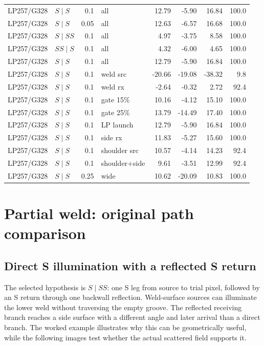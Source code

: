 {\begin{longtable}{@{}llrlrrrr@{}}
LP257/G328 & $S\mid S$ & 0.1 & all & 12.79 & -5.90 & 16.84 & 100.0 \\
LP257/G328 & $S\mid S$ & 0.05 & all & 12.63 & -6.57 & 16.68 & 100.0 \\
LP257/G328 & $S\mid SS$ & 0.1 & all & 4.97 & -3.75 & 8.58 & 100.0 \\
LP257/G328 & $SS\mid S$ & 0.1 & all & 4.32 & -6.00 & 4.65 & 100.0 \\
LP257/G328 & $S\mid S$ & 0.1 & all & 12.79 & -5.90 & 16.84 & 100.0 \\
LP257/G328 & $S\mid S$ & 0.1 & weld src & -20.66 & -19.08 & -38.32 & 9.8 \\
LP257/G328 & $S\mid S$ & 0.1 & weld rx & -2.64 & -0.32 & 2.72 & 92.4 \\
LP257/G328 & $S\mid S$ & 0.1 & gate 15\% & 10.16 & -4.12 & 15.10 & 100.0 \\
LP257/G328 & $S\mid S$ & 0.1 & gate 25\% & 13.79 & -14.49 & 17.40 & 100.0 \\
LP257/G328 & $S\mid S$ & 0.1 & LP launch & 12.79 & -5.90 & 16.84 & 100.0 \\
LP257/G328 & $S\mid S$ & 0.1 & side rx & 11.83 & -5.27 & 15.60 & 100.0 \\
LP257/G328 & $S\mid S$ & 0.1 & shoulder src & 10.57 & -4.14 & 14.23 & 92.4 \\
LP257/G328 & $S\mid S$ & 0.1 & shoulder+side & 9.61 & -3.51 & 12.99 & 92.4 \\
LP257/G328 & $S\mid S$ & 0.25 & wide & 10.62 & -20.09 & 10.83 & 100.0 \\
\end{longtable}}


\section{Partial weld: original path comparison}
\label{saftapp:partial}
\label{saftapp:archive:partial:principal}
\subsection{Direct S illumination with a reflected S return}
The selected hypothesis is $S\mid SS$: one S leg from source to trial pixel, followed by an S return through one backwall reflection. Weld-surface sources can illuminate the lower weld without traversing the empty groove. The reflected receiving branch reaches a side surface with a different angle and later arrival than a direct branch. The worked example illustrates why this can be geometrically useful, while the following images test whether the actual scattered field supports it.

